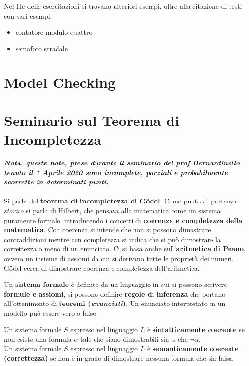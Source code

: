 \documentclass[a4paper,12pt, oneside]{book}
\begin{document}
Nel file delle esercitazioni si trovano ulteriori esempi, oltre alla citazione
di testi con vari esempi:
\begin{itemize}
  \item contatore modulo quattro
  \item semaforo stradale
\end{itemize}
\chapter{Model Checking}






\chapter{Seminario sul Teorema di Incompletezza}
\textit{\textbf{Nota: queste note, prese durante il seminario del prof
    Bernardinello tenuto il 1 Aprile 2020 sono incomplete, parziali e
    probabilmente scorrette in determinati punti.}}\\\\
Si parla del \textbf{teorema di incompletezza di G\"{o}del}. Come punto di
partenza \textit{storico} si parla di Hilbert, che pensava alla matematica come
un sistema puramente formale, introducendo i concetti di \textbf{coerenza e
  completezza della matematica}. Con coerenza si intende che non si possono
dimostrare contraddizioni mentre con completezza si indica che si può dimostrare
la correttezza o meno di un enunciato. Ci si basa anche sull'\textbf{aritmetica
  di Peano}, ovvero un insieme di assiomi da cui si derivano tutte le proprietà
dei numeri. \\
G\"{o}del cerca di dimostrare coerenza e completezza dell'aritmetica.
\begin{definizione}
  Un \textbf{sistema formale} è definito da un linguaggio in cui si possono
  scrivere \textbf{formule e assiomi}, si possono definire \textbf{regole di
    inferenza} che portano all'ottenimento di \textbf{teoremi
    (\textit{enunciati})}. Un enunciato interpretato in un modello può essere
  vero o falso
\end{definizione}
\begin{definizione}
  Un sistema formale $S$ espresso nel linguaggio $L$ è \textbf{sintatticamente
    coerente} se non esiste una formula $\alpha$ tale che siano dimostrabili sia
  $\alpha$ che $\neg \alpha$.\\
  Un sistema formale $S$ espresso nel linguaggio $L$ è \textbf{semanticamente
    coerente (correttezza)} se non è in grado di dimostrare nessuna formula che
  sia falsa.
\end{definizione}
\end{document}
